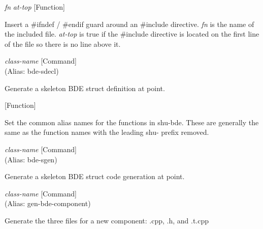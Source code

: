 \vspace{1em}
\noindent
{}
\usebox{\funcname}\emph{fn} \emph{at-top}
 \hfill [Function]

\begin{doc-string}
Insert a \#ifndef / \#endif guard around an \#include directive.  \emph{fn} is the name of
the included file.  \emph{at-top} is true if the \#include directive is located on the first
line of the file so there is no line above it.
\end{doc-string}

\vspace{1em}
\noindent
{}
\usebox{\funcname}\emph{class-name}
 \hfill [Command]\\%
 (Alias: bde-sdecl)

\begin{doc-string}
Generate a skeleton BDE struct definition at point.
\end{doc-string}

\vspace{1em}
\noindent
{}
\usebox{\funcname}
 \hfill [Function]

\begin{doc-string}
Set the common alias names for the functions in shu-bde.
These are generally the same as the function names with the leading
shu- prefix removed.
\end{doc-string}

\vspace{1em}
\noindent
{}
\usebox{\funcname}\emph{class-name}
 \hfill [Command]\\%
 (Alias: bde-sgen)

\begin{doc-string}
Generate a skeleton BDE struct code generation at point.
\end{doc-string}

\vspace{1em}
\noindent
{}
\usebox{\funcname}\emph{class-name}
 \hfill [Command]\\%
 (Alias: gen-bde-component)

\begin{doc-string}
Generate the three files for a new component: .cpp, .h, and .t.cpp
\end{doc-string}

